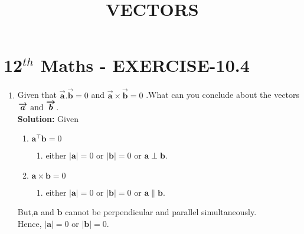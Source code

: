 \documentclass[10pt]{article}
\newcommand{\solution}{\noindent \textbf{Solution: }}
\providecommand{\abs}[1]{\left\vert#1\right\vert}
\let\vec\mathbf{}
\begin{document}
\begin{center}
\title{\textbf{VECTORS}}
\date{\vspace{-5ex}} %
\maketitle
\end{center}

\section{12$^{th}$ Maths - EXERCISE-10.4}

\begin{enumerate}
\item Given that $\boldsymbol{\overrightarrow{a}.\overrightarrow{b}}=0$ and $\boldsymbol{\overrightarrow{a}\times\overrightarrow{b}}=0$ .What can you conclude about the vectors $\boldsymbol{\overrightarrow{a}$ and $\overrightarrow{b}}$.\\  

\solution
Given  

\begin{enumerate}
\item $\vec{a}^\top\vec{b}=0$
\begin{enumerate}
\item either $\abs{\vec{a}}=0$ or $\abs{\vec{b}}=0$ or $\vec{a}\perp\vec{b}$.
\end{enumerate}
\item $\vec{a}\times\vec{b}=0$
\begin{enumerate}
\item either $\abs{\vec{a}}=0$ or $\abs{\vec{b}}=0$ or  $\vec{a}\parallel\vec{b}$.
\end{enumerate}
\end{enumerate}
But,$\vec{a}$ and $\vec{b}$ cannot be perpendicular and parallel simultaneously.\\
Hence, $\abs{\vec{a}}=0$ or $\abs{\vec{b}}=0$.

\end{enumerate}
\end{document}
